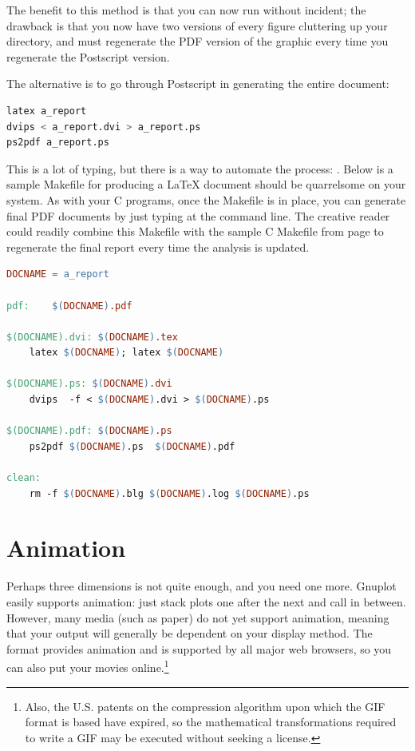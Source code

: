 The benefit to this method is that you can now run  without incident; the drawback is that you now have two
versions of every figure cluttering up your directory, and must
regenerate the PDF version of the graphic every time you regenerate the Postscript
version.

The alternative is to go through Postscript in generating the entire
document:
\begin{lstlisting}[language=sql]
latex a_report
dvips < a_report.dvi > a_report.ps
ps2pdf a_report.ps
\end{lstlisting}

This is a lot of typing, but there is a way to automate the process:
. Below is a sample Makefile for producing a \LaTeX{} document
should  be quarrelsome on your system. As with your C
programs, once the Makefile is in place, you can generate final PDF
documents by just typing  at the command line. The
creative reader could readily combine this Makefile with the sample C
Makefile from page \pageref{make} to regenerate the final report every
time the analysis is updated.

\begin{lstlisting}[language=make]
DOCNAME = a_report

pdf:	$(DOCNAME).pdf

$(DOCNAME).dvi: $(DOCNAME).tex
	latex $(DOCNAME); latex $(DOCNAME)

$(DOCNAME).ps: $(DOCNAME).dvi
	dvips  -f < $(DOCNAME).dvi > $(DOCNAME).ps

$(DOCNAME).pdf: $(DOCNAME).ps
	ps2pdf $(DOCNAME).ps  $(DOCNAME).pdf

clean:
	rm -f $(DOCNAME).blg $(DOCNAME).log $(DOCNAME).ps
\end{lstlisting}

\section{Animation} Perhaps three dimensions is not
quite enough, and you need one more. Gnuplot easily supports animation:
just stack plots one after the next and call  in between. However,
many media (such as paper) do not yet support animation, meaning that your
output will generally be dependent on your display method. The  format
provides animation and is supported by all major web browsers, so you
can also put your movies online.\footnote{Also, the U.S. patents on the
compression algorithm upon which the GIF format is based \citep{welch:lzw}
have expired, so the mathematical transformations required to write a
GIF may be executed without seeking a license.}

